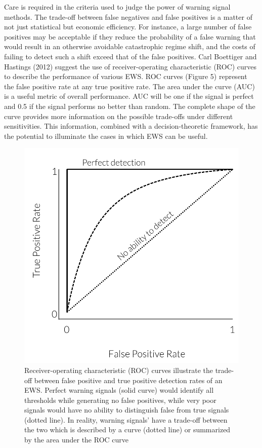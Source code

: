 \documentclass[author-year, review]{elsarticle} %
\makeatletter
\def\maxwidth{\ifdim\Gin@nat@width>\linewidth\linewidth
\else\Gin@nat@width\fi}
\let\Oldincludegraphics\includegraphics
\renewcommand{\includegraphics}[1]{\Oldincludegraphics[width=\maxwidth]{#1}}
\makeatother
\begin{document}
Care is required in the criteria used to judge the power of warning
signal methods. The trade-off between false negatives and false
positives is a matter of not just statistical but economic efficiency.
For instance, a large number of false positives may be acceptable if
they reduce the probability of a false warning that would result in an
otherwise avoidable catastrophic regime shift, and the costs of failing
to detect such a shift exceed that of the false positives. Carl
Boettiger and Hastings (2012) suggest the use of receiver-operating
characteristic (ROC) curves to describe the performance of various EWS.
ROC curves (Figure 5) represent the false positive rate at any true
positive rate. The area under the curve (AUC) is a useful metric of
overall performance. AUC will be one if the signal is perfect and 0.5 if
the signal performs no better than random. The complete shape of the
curve provides more information on the possible trade-offs under
different sensitivities. This information, combined with a
decision-theoretic framework, has the potential to illuminate the cases
in which EWS can be useful.

\begin{figure}[htbp]
\centering
\includegraphics{ROC.pdf}
\caption{Receiver-operating characteristic (ROC) curves illustrate the
trade-off between false positive and true positive detection rates of an
EWS. Perfect warning signals (solid curve) would identify all thresholds
while generating no false positives, while very poor signals would have
no ability to distinguish false from true signals (dotted line). In
reality, warning signals' have a trade-off between the two which is
described by a curve (dotted line) or summarized by the area under the
ROC curve}
\end{figure}
\end{document}

